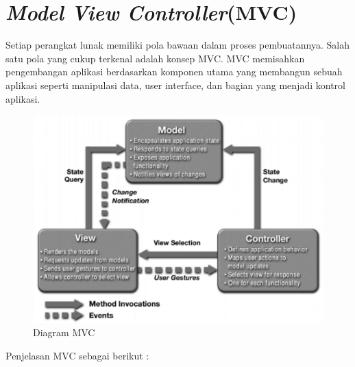 \section{\textit{Model View Controller}(MVC)}
Setiap perangkat lunak memiliki pola bawaan dalam proses pembuatannya. Salah satu pola yang cukup terkenal adalah konsep MVC. MVC memisahkan pengembangan aplikasi berdasarkan komponen utama yang membangun sebuah aplikasi seperti manipulasi data, user interface, dan bagian yang menjadi kontrol aplikasi. 
\begin{figure}[h]
	\centering
	\includegraphics[scale=0.65]{Gambar/MVC}
	\caption{Diagram MVC}
	\end{figure}

Penjelasan MVC sebagai berikut \cite{Hans:2014}:

